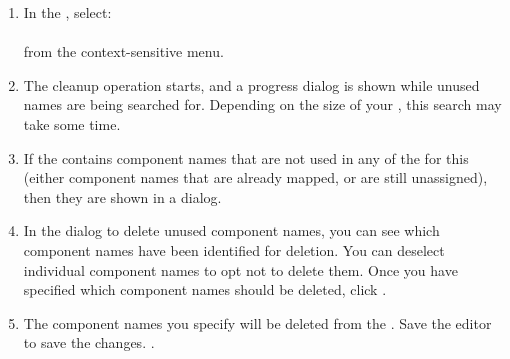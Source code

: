 \begin{enumerate}
\item In the \gdomeditor{}, select:\\
\\
from the context-sensitive menu. 
\item The cleanup operation starts, and a progress dialog is shown while unused names are being searched for. Depending on the size of your \gdproject{}, this search may take some time. 
\item If the \gdomeditor{} contains component names that are not used in any of the \gdsuites{} for this \gdaut{} (either component names that are already mapped, or are still unassigned), then they are shown in a  dialog. 
\item In the dialog to delete unused component names, you can see which component names have been identified for deletion. You can deselect individual component names to opt not to delete them. Once you have specified which component names should be deleted, click . 
\item The component names you specify will be deleted from the \gdomeditor{}. Save the editor to save the changes. 
.
\end{enumerate}
